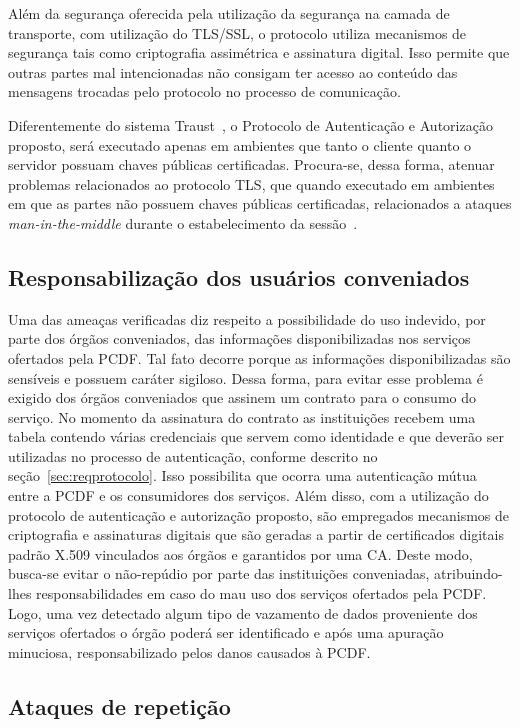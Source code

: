 Além da segurança oferecida pela utilização da segurança na camada de transporte, com utilização do TLS/SSL, o protocolo utiliza mecanismos de segurança tais como criptografia assimétrica e assinatura digital. Isso permite que outras partes mal intencionadas não consigam ter acesso ao conteúdo das mensagens trocadas pelo protocolo no processo de comunicação.

Diferentemente do sistema Traust~\cite{traust08}, o Protocolo de Autenticação e Autorização proposto, será executado apenas em ambientes que tanto o cliente quanto o servidor possuam chaves públicas certificadas. Procura-se, dessa forma, atenuar problemas relacionados ao protocolo TLS, que quando executado em ambientes em que as partes n\~{a}o possuem chaves públicas certificadas, relacionados a ataques \emph{man-in-the-middle} durante o estabelecimento da sessão~\cite{traust08}.

\subsection{Responsabilização dos usuários conveniados}

Uma das ameaças verificadas diz respeito a possibilidade do uso indevido, por parte dos órgãos conveniados, das informações disponibilizadas nos serviços ofertados pela PCDF. Tal fato decorre porque as informações disponibilizadas s\~{a}o sensíveis e possuem caráter sigiloso. Dessa forma, para evitar esse problema é exigido dos órgãos conveniados que assinem um contrato para o consumo do serviço. No momento da assinatura do contrato as institui\c c\~{o}es recebem uma tabela contendo várias credenciais que servem como identidade e que deverão ser utilizadas no processo de autenticação, conforme descrito no seção~\ref{sec:reqprotocolo}. Isso possibilita que ocorra uma autenticação mútua entre a PCDF e os consumidores dos serviços. Além disso, com a utilização do protocolo de autenticação e autorização proposto, são empregados mecanismos de criptografia e assinaturas digitais que são geradas a partir de certificados digitais padrão X.509 vinculados aos órgãos e garantidos por uma CA. Deste modo, busca-se evitar o não-repúdio por parte das instituições conveniadas, atribuindo-lhes responsabilidades em caso do mau uso dos serviços ofertados pela PCDF. Logo, uma vez detectado algum tipo de vazamento de dados proveniente dos serviços ofertados o órgão poderá ser identificado e após uma apuração minuciosa, responsabilizado pelos danos causados à PCDF.

\subsection{Ataques de repetição}

